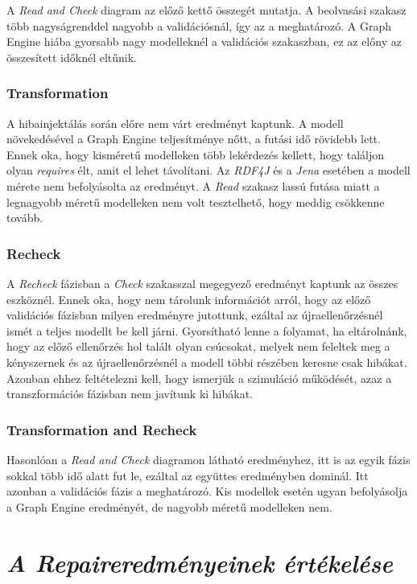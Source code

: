 A \emph{Read and Check} diagram az előző kettő összegét mutatja. A beolvasási szakasz több nagyságrenddel nagyobb a validációsnál, így az a meghatározó. A Graph Engine hiába gyorsabb nagy modelleknél a validációs szakaszban, ez az előny az összesített időknél eltűnik. 

\subsubsection{Transformation}

A hibainjektálás során előre nem várt eredményt kaptunk. A modell növekedésével a Graph Engine teljesítménye nőtt, a futási idő rövidebb lett. Ennek oka, hogy kisméretű modelleken több lekérdezés kellett, hogy találjon olyan \emph{requires} élt, amit el lehet távolítani. Az \emph{RDF4J} és a \emph{Jena} esetében a modell mérete nem befolyásolta az eredményt. A \emph{Read} szakasz lassú futása miatt a legnagyobb méretű modelleken nem volt tesztelhető, hogy meddig csökkenne tovább.

\subsubsection{Recheck}

A \emph{Recheck} fázisban a \emph{Check} szakasszal megegyező eredményt kaptunk az összes eszköznél. Ennek oka, hogy nem tárolunk információt arról, hogy az előző validációs fázisban milyen eredményre jutottunk, ezáltal az újraellenőrzésnél ismét a teljes modellt be kell járni. Gyorsítható lenne a folyamat, ha eltárolnánk, hogy az előző ellenőrzés hol talált olyan csúcsokat, melyek nem feleltek meg a kényszernek és az újraellenőrzésnél a modell többi részében keresne csak hibákat. Azonban ehhez feltételezni kell, hogy ismerjük a szimuláció működését, azaz a transzformációs fázisban nem javítunk ki hibákat.

\subsubsection{Transformation and Recheck}

Hasonlóan a \emph{Read and Check} diagramon látható eredményhez, itt is az egyik fázis sokkal több idő alatt fut le, ezáltal az együttes eredményben dominál. Itt azonban a validációs fázis a meghatározó. Kis modellek esetén ugyan befolyásolja a Graph Engine eredményét, de nagyobb méretű modelleken nem.

\section{\emph{A Repaireredményeinek értékelése}}

